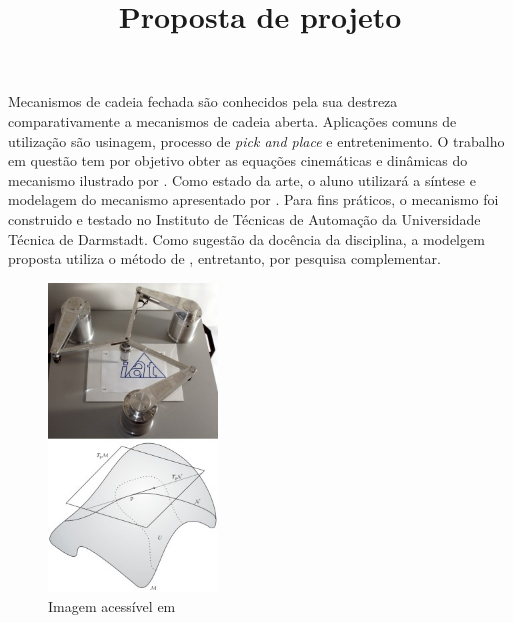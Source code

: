 \documentclass[]{article}
\title{Proposta de projeto}
\author{\studentname \qquad \uspid \qquad \uspmail}
\begin{document}
\maketitle

Mecanismos de cadeia fechada são conhecidos pela sua destreza comparativamente a mecanismos de cadeia aberta. Aplicações comuns de utilização são usinagem, processo de \emph{pick and place} e entretenimento. O trabalho em questão tem por objetivo obter as equações cinemáticas e dinâmicas do mecanismo ilustrado por \autocite{deskriptor2014}. Como estado da arte, o aluno utilizará a síntese e modelagem do mecanismo apresentado por \citeauthor{tubiblio52241}. Para fins práticos, o mecanismo foi construido e testado no Instituto de Técnicas de Automação da Universidade Técnica de Darmstadt. Como sugestão da docência da disciplina, a modelgem proposta utiliza o método de \citeauthor{udwadia_kalaba_1996}, entretanto, por pesquisa complementar.

\begin{figure}[!h]
    \centering
    \includegraphics[width=0.4\textwidth]{images/Forschung_Homepage_DLneu_255x0.jpg}
    \caption{Imagem acessível em }
    \label{fig:my_label}
\end{figure}

\newpage

\printbibliography 
\end{document}
